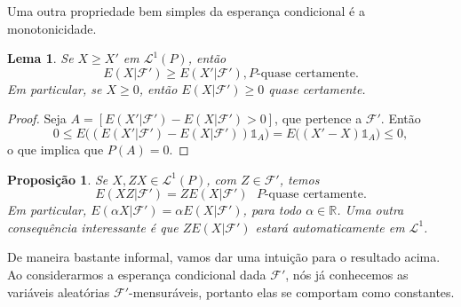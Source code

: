 \documentclass[reqno]{article}
\newcommand*\1{\mathds{1}}
\newtheorem{lemma}[theorem]{Lema}
\newtheorem{proposition}[theorem]{Proposição}
\begin{document}
Uma outra propriedade bem simples da esperança condicional é a monotonicidade.

\begin{lemma}
  \label{l:ec_mono}
  Se $X \geq X'$ em $\mathcal{L}^1(P)$, então
  \begin{equation}
    E(X|\mathcal{F}') \geq E(X'|\mathcal{F}'), \text{$P$-quase certamente.}
  \end{equation}
  Em particular, se $X \geq 0$, então $E(X|\mathcal{F}') \geq 0$ quase certamente.
\end{lemma}

\begin{proof}
  Seja $A = [E(X'|\mathcal{F}') - E(X|\mathcal{F}') > 0]$, que pertence a $\mathcal{F}'$.
  Então
  \begin{equation}
    0 \leq E\big( (E(X'|\mathcal{F}') - E(X|\mathcal{F}')) \1_A \big) = E\big((X' - X) \1_A\big) \leq 0,
  \end{equation}
  o que implica que $P(A) = 0$.
\end{proof}



\begin{proposition}
  \label{p:EZX_ZEX}
  Se $X, ZX \in \mathcal{L}^1(P)$, com $Z \in \mathcal{F}'$, temos
  \begin{equation}
    E(XZ|\mathcal{F}') = Z E(X|\mathcal{F}') \text{ $P$-quase certamente}.
  \end{equation}
  Em particular, $E(\alpha X|\mathcal{F}') = \alpha E(X|\mathcal{F}')$, para todo $\alpha \in \mathbb{R}$.
  Uma outra consequência interessante é que $Z E(X|\mathcal{F}')$ estará automaticamente em $\mathcal{L}^1$.
\end{proposition}

De maneira bastante informal, vamos dar uma intuição para o resultado acima.
Ao considerarmos a esperança condicional dada $\mathcal{F}'$, nós já conhecemos as variáveis aleatórias $\mathcal{F}'$-mensuráveis, portanto elas se comportam como constantes.
\end{document}
